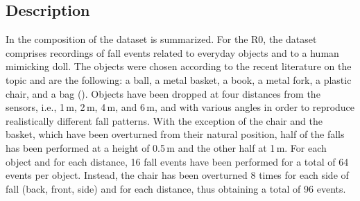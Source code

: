 \subsection{Description}
In  the composition of the dataset is summarized.
For the R0, the dataset comprises recordings of fall events related to everyday objects and to a human mimicking doll. The objects were chosen according to the recent literature on the topic \cite{alwan2006smart} and are the following: a ball, a metal basket, a book, a metal fork, a plastic chair, and a bag (). Objects have been dropped at four distances from the sensors, i.e., 1\,m, 2\,m, 4\,m, and 6\,m, and with various angles in order to reproduce realistically different fall patterns. With the exception of the chair and the basket, which have been overturned from their natural position, half of the falls has been performed at a height of 0.5\,m and the other half at 1\,m. For each object and for each distance, 16 fall events have been performed for a total of 64 events per object. Instead, the chair has been overturned 8 times for each side of fall (back, front, side) and for each distance, thus obtaining a total of 96 events.

